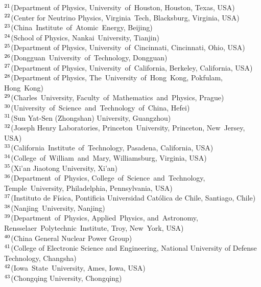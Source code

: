 {$^{21}$(Department of Physics, University~of~Houston, Houston, Texas, USA) \\ 
$^{22}$(Center for Neutrino Physics, Virginia~Tech, Blacksburg, Virginia, USA) \\ 
$^{23}$(China~Institute~of~Atomic~Energy, Beijing) \\ 
$^{24}$(School of Physics, Nankai~University, Tianjin) \\ 
$^{25}$(Department of Physics, University~of~Cincinnati, Cincinnati, Ohio, USA) \\ 
$^{26}$(Dongguan~University~of~Technology, Dongguan) \\ 
$^{27}$(Department of Physics, University~of~California, Berkeley, California, USA) \\ 
$^{28}$(Department of Physics, The~University~of~Hong~Kong, Pokfulam, Hong~Kong) \\ 
$^{29}$(Charles~University, Faculty~of~Mathematics~and~Physics, Prague) \\ 
$^{30}$(University~of~Science~and~Technology~of~China, Hefei) \\ 
$^{31}$(Sun Yat-Sen (Zhongshan) University, Guangzhou) \\ 
$^{32}$(Joseph Henry Laboratories, Princeton~University, Princeton, New~Jersey, USA) \\ 
$^{33}$(California~Institute~of~Technology, Pasadena, California, USA) \\ 
$^{34}$(College~of~William~and~Mary, Williamsburg, Virginia, USA) \\ 
$^{35}$(Xi'an Jiaotong University, Xi'an) \\ 
$^{36}$(Department~of~Physics, College~of~Science~and~Technology, Temple~University, Philadelphia, Pennsylvania, USA) \\ 
$^{37}$(Instituto de F\'isica, Pontificia Universidad Cat\'olica de Chile, Santiago, Chile) \\ 
$^{38}$(Nanjing~University, Nanjing) \\ 
$^{39}$(Department~of~Physics, Applied~Physics, and~Astronomy, Rensselaer~Polytechnic~Institute, Troy, New~York, USA) \\ 
$^{40}$(China General Nuclear Power Group) \\ 
$^{41}$(College of Electronic Science and Engineering, National University of Defense Technology, Changsha) \\ 
$^{42}$(Iowa~State~University, Ames, Iowa, USA) \\ 
$^{43}$(Chongqing University, Chongqing) \\ 
} 
